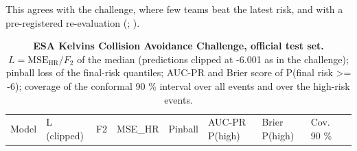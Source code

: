 \documentclass[
]{article}
\begin{document}
This agrees with the challenge, where few teams beat the latest risk,
and with a pre-registered re-evaluation
(;
).

\begin{longtable}[]{@{}
  >{\raggedright\arraybackslash}p{}
  >{\raggedright\arraybackslash}p{}
  >{\raggedright\arraybackslash}p{}
  >{\raggedright\arraybackslash}p{}
  >{\raggedright\arraybackslash}p{}
  >{\raggedright\arraybackslash}p{}
  >{\raggedright\arraybackslash}p{}
  >{\raggedright\arraybackslash}p{}
  >{\raggedright\arraybackslash}p{}@{}}
\caption{\textbf{ESA Kelvins Collision Avoidance Challenge, official
test set.} \(L = \text{MSE}_\text{HR}/F_2\) of the median (predictions
clipped at -6.001 as in the challenge); pinball loss of the final-risk
quantiles; AUC-PR and Brier score of P(final risk \textgreater= -6);
coverage of the conformal 90 \% interval over all events and over the
high-risk events.}\label{tbl:cac}\tabularnewline
\toprule\noalign{}
\begin{minipage}[b]{\linewidth}\raggedright
Model
\end{minipage} & \begin{minipage}[b]{\linewidth}\raggedright
L (clipped)
\end{minipage} & \begin{minipage}[b]{\linewidth}\raggedright
F2
\end{minipage} & \begin{minipage}[b]{\linewidth}\raggedright
MSE\_HR
\end{minipage} & \begin{minipage}[b]{\linewidth}\raggedright
Pinball
\end{minipage} & \begin{minipage}[b]{\linewidth}\raggedright
AUC-PR P(high)
\end{minipage} & \begin{minipage}[b]{\linewidth}\raggedright
Brier P(high)
\end{minipage} & \begin{minipage}[b]{\linewidth}\raggedright
Cov. 90 \%

\end{minipage}
\end{longtable}
\end{document}
